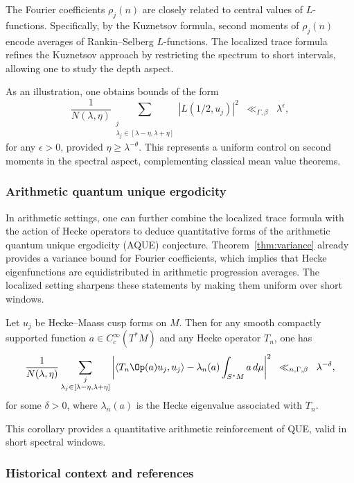 The Fourier coefficients $\rho_j(n)$ are closely related to central values of $L$-functions. Specifically, by the Kuznetsov formula, second moments of $\rho_j(n)$ encode averages of Rankin–Selberg $L$-functions. The localized trace formula refines the Kuznetsov approach by restricting the spectrum to short intervals, allowing one to study the depth aspect.

As an illustration, one obtains bounds of the form
\[
\frac{1}{N(\lambda,\eta)} \sum_{\substack{j \\ \lambda_j \in [\lambda-\eta,\lambda+\eta]}} |L(1/2, u_j)|^2
\;\;\ll_{\Gamma,\beta}\;\; \lambda^{\epsilon},
\]
for any $\epsilon > 0$, provided $\eta \geq \lambda^{-\theta}$. This represents a uniform control on second moments in the spectral aspect, complementing classical mean value theorems.

\subsubsection{Arithmetic quantum unique ergodicity}

In arithmetic settings, one can further combine the localized trace formula with the action of Hecke operators to deduce quantitative forms of the arithmetic quantum unique ergodicity (AQUE) conjecture. Theorem~\ref{thm:variance} already provides a variance bound for Fourier coefficients, which implies that Hecke eigenfunctions are equidistributed in arithmetic progression averages. The localized setting sharpens these statements by making them uniform over short windows.

\begin{corollary}\label{cor:aque}
Let $u_j$ be Hecke–Maass cusp forms on $M$. Then for any smooth compactly supported function $a \in C_c^\infty(T^*M)$ and any Hecke operator $T_n$, one has
\[
\frac{1}{N(\lambda,\eta)} \sum_{\substack{j \\ \lambda_j \in [\lambda-\eta,\lambda+\eta]}}
\left| \langle T_n \Op(a) u_j, u_j \rangle - \lambda_n(a) \int_{S^*M} a \, d\mu \right|^2
\;\;\ll_{n,\Gamma,\beta}\;\; \lambda^{-\delta},
\]
for some $\delta > 0$, where $\lambda_n(a)$ is the Hecke eigenvalue associated with $T_n$.
\end{corollary}

This corollary provides a quantitative arithmetic reinforcement of QUE, valid in short spectral windows.

\subsubsection{Historical context and references}

